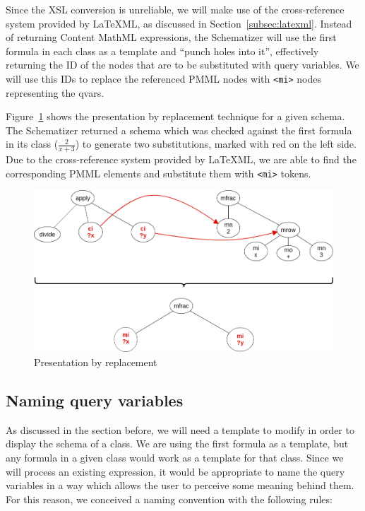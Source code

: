 \documentclass[a4paper,oneside]{article}
\def\cmml{\textsf{Content MathML}\xspace}
\def\latexml{\LaTeX{ML}\xspace}
\begin{document}
Since the XSL conversion is unreliable, we will make use of the cross-reference
system provided by \latexml, as discussed in Section~\ref{subsec:latexml}.
Instead of returning \cmml expressions, the Schematizer will use the first
formula in each class as a template and ``punch holes into it'', effectively
returning the ID of the nodes that are to be substituted with query variables.
We will use this IDs to replace the referenced PMML nodes with \verb|<mi>|
nodes representing the qvars.

Figure~\ref{fig:replacement_pres} shows the presentation by replacement
technique for a given schema. The Schematizer returned a schema which was
checked against the first formula in its class ($\frac{2}{x+3}$) to generate
two substitutions, marked with red on the left side. Due to the cross-reference
system provided by \latexml, we are able to find the corresponding PMML
elements and substitute them with \verb|<mi>| tokens.

\begin{figure}[ht]\centering
    \includegraphics[scale=0.5]{img/replacement_pres.png}
    \caption{Presentation by replacement}\label{fig:replacement_pres}
\end{figure}
\FloatBarrier

\subsection{Naming query variables}\label{subsec:naming_qvars}
As discussed in the section before, we will need a template to modify in order
to display the schema of a class. We are using the first formula as a template,
but any formula in a given class would work as a template for that class.
Since we will process an existing expression, it would be appropriate to name
the query variables in a way which allows the user to perceive some meaning
behind them. For this reason, we conceived a naming convention with the
following rules:
\end{document}
